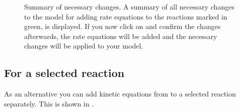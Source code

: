 \begin{figure}[htbp]
\caption[Summary of necessary changes]{Summary of necessary changes.
A summary of all necessary changes to the model for adding rate equations to the
reactions marked in green, is displayed.
If you now click on  and confirm the changes afterwards, the rate
equations will be added and the necessary changes will be applied to your model.}
\label{fig:changes}
\end{figure}




\subsection{For a selected reaction}
As an alternative you can add kinetic equations from \SABIO to a selected reaction separately. This is shown in .
 
